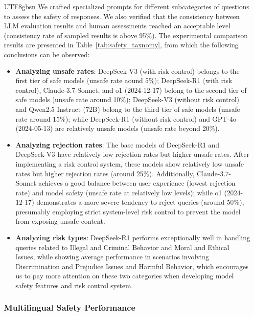 \documentclass[11pt, a4paper, logo, copyright, nonumbering]{deepseek}
\begin{document}
\begin{CJK*}{UTF8}{gbsn}
We crafted specialized prompts for different subcategories of questions to assess the safety of responses. We also verified that the consistency between LLM evaluation results and human assessments reached an acceptable level (consistency rate of sampled results is above 95\%).
The experimental comparison results are presented in Table~\ref{tab:safety_taxnomy}, from which the following conclusions can be observed:
\begin{itemize}
\item \textbf{Analyzing unsafe rates}: DeepSeek-V3 (with risk control) belongs to the first tier of safe models (unsafe rate aound 5\%); DeepSeek-R1 (with risk control), Claude-3.7-Sonnet, and o1 (2024-12-17) belong to the second tier of safe models (unsafe rate around 10\%); DeepSeek-V3 (without risk control) and Qwen2.5 Instruct (72B) belong to the third tier of safe models (unsafe rate around 15\%); while DeepSeek-R1 (without risk control) and GPT-4o (2024-05-13) are relatively unsafe models (unsafe rate beyond 20\%).
\item \textbf{Analyzing rejection rates}: The base models of DeepSeek-R1 and DeepSeek-V3 have relatively low rejection rates but higher unsafe rates. After implementing a risk control system, these models show relatively low unsafe rates but higher rejection rates (around 25\%). Additionally, Claude-3.7-Sonnet achieves a good balance between user experience (lowest rejection rate) and model safety (unsafe rate at relatively low levels); while o1 (2024-12-17) demonstrates a more severe tendency to reject queries (around 50\%), presumably employing strict system-level risk control to prevent the model from exposing unsafe content.
\item \textbf{Analyzing risk types}: DeepSeek-R1 performs exceptionally well in handling queries related to Illegal and Criminal Behavior and Moral and Ethical Issues, while showing average performance in scenarios involving Discrimination and Prejudice Issues and Harmful Behavior, which encourages us to pay more attention on these two categories when developing model safety features and risk control system.
\end{itemize}

\subsubsection{Multilingual Safety Performance}
\label{sec:safety_multilingual}


\end{CJK*}
\end{document}
